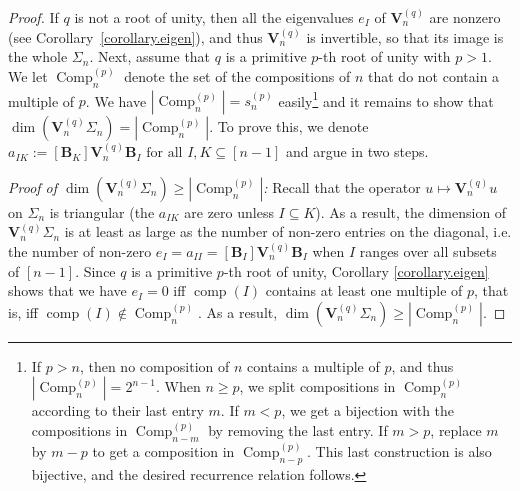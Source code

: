 \documentclass[10pt,a4paper]{amsart}
\newcommand{\Comp}{\operatorname{Comp}}
\newcommand{\VVq}{\mathbf{V}^{(q)}} %
\newcommand{\comp}{\operatorname{comp}}
\begin{document}
\begin{proof}
If $q$ is not a root of unity,
then all the eigenvalues $e_I$ of $\VVq_n$ are nonzero (see Corollary~\ref{corollary.eigen}),
and thus $\VVq_n$ is invertible, so that its image is the whole $\Sigma_n$. Next, assume that $q$ is a primitive $p$-th root of unity with $p>1$.
We let $\Comp_n^{(p)}$ denote the set of the compositions of $n$ that do not contain a multiple of $p$.
We have $|\Comp_n^{(p)}| = s_n^{(p)}$ easily\footnote{%
If $p >n$, then no composition of $n$ contains a multiple of $p$, and thus $|\Comp_n^{(p)}| = 2^{n-1}$.
When $n\geq p$, we split compositions in $\Comp_n^{(p)}$ according to their last entry $m$.
If $m <p$, we get a bijection with the compositions in $\Comp_{n-m}^{(p)}$ by removing the last entry.
If $m>p$, replace $m$ by $m-p$ to get a composition in $\Comp_{n-p}^{(p)}$.
This last construction is also bijective, and the desired recurrence relation follows.} and it remains to show that $\dim\left(\mathbf{V}_n^{(q)}\Sigma_n\right) = |\Comp_n^{(p)}|$.
To prove this, we denote
$
a_{IK} := [\mathbf{B}_K]\mathbf{V}^{(q)}_n\mathbf{B}_I  \text{ for all } I, K \subseteq [n-1] 
$
and argue in two steps.

\textit{Proof of $\dim\left(\mathbf{V}_n^{(q)}\Sigma_n\right) \geq |\Comp_n^{(p)}|$:}
Recall that the operator $u \mapsto \mathbf{V}_n^{(q)} u$ on $\Sigma_n$ is triangular (the $a_{IK}$ are zero unless $I\subseteq K$). As a result, the dimension of $\mathbf{V}_n^{(q)}\Sigma_n$  is at least as large as the number of non-zero entries on the diagonal, i.e. the number of non-zero $e_I=a_{II}=[\mathbf{B}_I]\mathbf{V}^{(q)}_n\mathbf{B}_I$ when $I$ ranges over all subsets of $[n-1]$.
Since $q$ is a primitive $p$-th root of unity, Corollary \ref{corollary.eigen} shows that we have $e_I =0$ iff $\comp(I)$ contains at least one multiple of $p$, that is, iff $\comp(I) \notin \Comp_n^{(p)}$.
As a result, $\dim\left(\mathbf{V}_n^{(q)}\Sigma_n\right) \geq |\Comp_n^{(p)}|$.


\end{proof}
\end{document}
